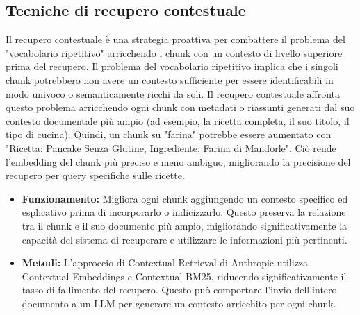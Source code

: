 \documentclass[a4paper, 11pt]{article}
\begin{document}
\subsection{Tecniche di recupero contestuale}
Il recupero contestuale è una strategia proattiva per combattere il problema del "vocabolario ripetitivo" arricchendo i chunk con un contesto di livello superiore prima del recupero. \cite{contextual_retrieval_pluralsight} Il problema del vocabolario ripetitivo implica che i singoli chunk potrebbero non avere un contesto sufficiente per essere identificabili in modo univoco o semanticamente ricchi da soli. \cite{contextual_retrieval_mlexpert} Il recupero contestuale affronta questo problema arricchendo ogni chunk con metadati o riassunti generati dal suo contesto documentale più ampio (ad esempio, la ricetta completa, il suo titolo, il tipo di cucina). Quindi, un chunk su "farina" potrebbe essere aumentato con "Ricetta: Pancake Senza Glutine, Ingrediente: Farina di Mandorle". Ciò rende l'embedding del chunk più preciso e meno ambiguo, migliorando la precisione del recupero per query specifiche sulle ricette.
\begin{itemize}
    \item \textbf{Funzionamento:} Migliora ogni chunk aggiungendo un contesto specifico ed esplicativo prima di incorporarlo o indicizzarlo. \cite{contextual_retrieval_pluralsight} Questo preserva la relazione tra il chunk e il suo documento più ampio, migliorando significativamente la capacità del sistema di recuperare e utilizzare le informazioni più pertinenti.
    \item \textbf{Metodi:} L'approccio di Contextual Retrieval di Anthropic \cite{contextual_retrieval_mlexpert} utilizza Contextual Embeddings e Contextual BM25, riducendo significativamente il tasso di fallimento del recupero. Questo può comportare l'invio dell'intero documento a un LLM per generare un contesto arricchito per ogni chunk. \cite{contextual_retrieval_somawansa}
\end{itemize}
\end{document}
